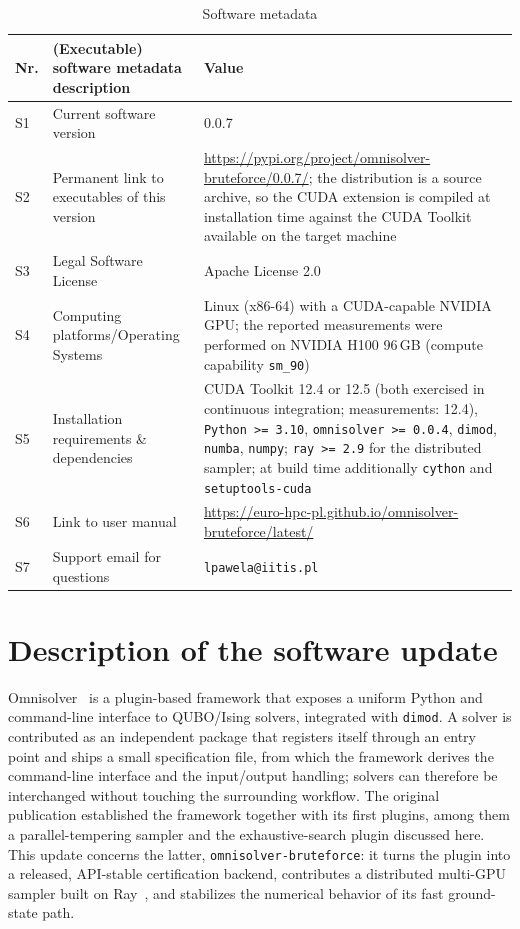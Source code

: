\documentclass[preprint,12pt,a4paper]{elsarticle}
\newcommand{\cudameas}{12.4}
\begin{document}
\begin{table}[H]
\setlength{\tabcolsep}{4pt}
\begin{tabular}{|l|p{5.6cm}|p{6.4cm}|}
\hline
\textbf{Nr.} & \textbf{(Executable) software metadata description} &
\textbf{Value} \\
\hline
S1 & Current software version & 0.0.7 \\
\hline
S2 & Permanent link to executables of this version &
\url{https://pypi.org/project/omnisolver-bruteforce/0.0.7/}; the distribution is
a source archive, so the CUDA extension is compiled at installation time against
the CUDA Toolkit available on the target machine \\
\hline
S3 & Legal Software License & Apache License 2.0 \\
\hline
S4 & Computing platforms/Operating Systems & Linux (x86-64) with a CUDA-capable
NVIDIA GPU; the reported measurements were performed on NVIDIA H100 96\,GB
(compute capability \texttt{sm\_90}) \\
\hline
S5 & Installation requirements \& dependencies & CUDA Toolkit 12.4 or 12.5
(both exercised in continuous integration; measurements: \cudameas), \texttt{Python >= 3.10},
\texttt{omnisolver >= 0.0.4}, \texttt{dimod}, \texttt{numba}, \texttt{numpy};
\texttt{ray >= 2.9} for the distributed sampler; at build time additionally
\texttt{cython} and \texttt{setuptools-cuda} \\
\hline
S6 & Link to user manual & \url{https://euro-hpc-pl.github.io/omnisolver-bruteforce/latest/} \\
\hline
S7 & Support email for questions & \verb|lpawela@iitis.pl| \\
\hline
\end{tabular}
\caption{Software metadata}
\label{softwareMetadata}
\end{table}

\linenumbers

\section{Description of the software update}
\label{sec:description}

Omnisolver~\cite{jalowiecki2021omnisolver} is a plugin-based framework that
exposes a uniform Python and command-line interface to QUBO/Ising solvers,
integrated with \texttt{dimod}. A solver is contributed as an independent
package that registers itself through an entry point and ships a small
specification file, from which the framework derives the command-line interface
and the input/output handling; solvers can therefore be interchanged without
touching the surrounding workflow. The original publication established the
framework together with its first plugins, among them a parallel-tempering
sampler and the exhaustive-search plugin discussed here. This update concerns
the latter, \texttt{omnisolver-bruteforce}: it turns the plugin into a released,
API-stable certification backend, contributes a distributed multi-GPU sampler
built on Ray~\cite{DBLP:journals/corr/abs-1712-05889}, and stabilizes the
numerical behavior of its fast ground-state path.
\end{document}
